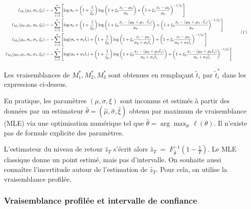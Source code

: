 \documentclass[
  article,
  nofooter,
  noheadings]{jss}
\begin{document}
\[
\scalebox{0.7}{
\(
\begin{aligned}
\ell_{M_0}(\mu_0, \sigma_0, \xi_0) &=
-\sum_{i=1}^n \left[
\log \sigma_0 +
\left(1 + \frac{1}{\xi_0} \right) \log \left(1 + \xi_0 \frac{x_i - \mu_0}{\sigma_0} \right) +
\left(1 + \xi_0 \frac{x_i - \mu_0}{\sigma_0} \right)^{-1/\xi_0}
\right]\\ 
\ell_{M_1}(\mu_0, \mu_1, \sigma_0, \xi_0) &=
-\sum_{i=1}^n \left[
\log \sigma_0 +
\left(1 + \frac{1}{\xi_0} \right) \log \left(1 + \xi_0 \frac{x_i - (\mu_0 + \mu_1 \cdot \tilde{t}_i)}{\sigma_0} \right) +
\left(1 + \xi_0 \frac{x_i - (\mu_0 + \mu_1 \cdot \tilde{t}_i)}{\sigma_0} \right)^{-1/\xi_0}
\right]\\ 
\ell_{M_2}(\mu_0, \sigma_0, \sigma_1, \xi_0) &=
-\sum_{i=1}^n \left[
\log (\sigma_0 + \sigma_1 \tilde{t}_i) +
\left(1 + \frac{1}{\xi_0} \right) \log \left(1 + \xi_0 \frac{x_i - \mu_0}{\sigma_0 + \sigma_1 \tilde{t}_i} \right) +
\left(1 + \xi_0 \frac{x_i - \mu_0}{\sigma_0 + \sigma_1 \tilde{t}_i} \right)^{-1/\xi_0}
\right]\\ 
\ell_{M_3}(\mu_0, \mu_1, \sigma_0, \sigma_1, \xi_0) &=
-\sum_{i=1}^n \left[
\log (\sigma_0 + \sigma_1 \tilde{t}_i) +
\left(1 + \frac{1}{\xi_0} \right) \log \left(1 + \xi_0 \frac{x_i - (\mu_0 + \mu_1 \tilde{t}_i)}{\sigma_0 + \sigma_1 \tilde{t}_i} \right) +
\left(1 + \xi_0 \frac{x_i - (\mu_0 + \mu_1 \tilde{t}_i)}{\sigma_0 + \sigma_1 \tilde{t}_i} \right)^{-1/\xi_0}
\right]
\end{aligned}
\tag{1'}
\)
}
\]

Les vraisemblances de \(M_1^*, M_2^*, M_3^*\) sont obtenues en
remplaçant \(\tilde{t}_i\) par \(\tilde{t}_i^\ast\) dans les expressions
ci-dessus.

En pratique, les paramètres \((\mu, \sigma, \xi)\) sont inconnus et
estimés à partir des données par un estimateur
\(\hat{\theta} = (\hat{\mu}, \hat{\sigma}, \hat{\xi})\) obtenu par
maximum de vraisemblance (MLE) via une optimisation numérique tel que
\(\hat{\theta} = \arg\max_{\theta} \, \ell(\theta)\). Il n'existe pas de
formule explicite des paramètres.

L'estimateur du niveau de retour \(\hat{z}_T\) s'écrit alors
\(\hat{z}_{T}\;=\;F^{-1}_{\hat{\theta}}\!\left(1-\frac{1}{T}\right)\).
Le MLE classique donne un point estimé, mais pas d'intervalle. On
souhaite aussi connaître l'incertitude autour de l'estimation de
\(\hat{z}_T\). Pour cela, on utilise la vraisemblance profilée.

\subsubsection{Vraisemblance profilée et intervalle de
confiance}\label{vraisemblance-profiluxe9e-et-intervalle-de-confiance}
\end{document}
